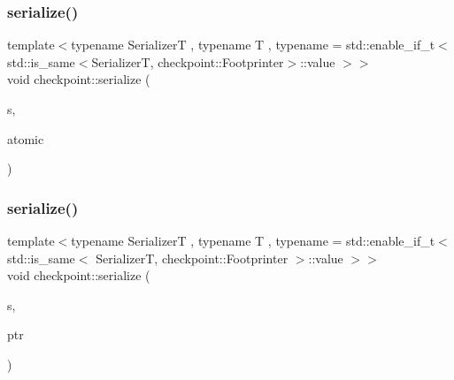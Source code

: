 \mbox{\label{namespacecheckpoint_a40ca9a5c99807bd8a0610098d94b5125}} 
\subsubsection{\texorpdfstring{serialize()}{serialize()}\hspace{0.1cm}{\footnotesize\ttfamily [7/29]}}
{\footnotesize\ttfamily template$<$typename SerializerT , typename T , typename  = std\+::enable\+\_\+if\+\_\+t$<$    std\+::is\+\_\+same$<$\+Serializer\+T, checkpoint\+::\+Footprinter$>$\+::value  $>$$>$ \\
void checkpoint\+::serialize (\begin{DoxyParamCaption}\item[{SerializerT \&}]{s,  }\item[{const std\+::atomic$<$ T $>$ \&}]{atomic }\end{DoxyParamCaption})}

\mbox{\label{namespacecheckpoint_aff1bebba5ce7fda79f83d2af8c859254}} 
\subsubsection{\texorpdfstring{serialize()}{serialize()}\hspace{0.1cm}{\footnotesize\ttfamily [8/29]}}
{\footnotesize\ttfamily template$<$typename SerializerT , typename T , typename  = std\+::enable\+\_\+if\+\_\+t$<$    std\+::is\+\_\+same$<$      Serializer\+T,      checkpoint\+::\+Footprinter    $>$\+::value  $>$$>$ \\
void checkpoint\+::serialize (\begin{DoxyParamCaption}\item[{SerializerT \&}]{s,  }\item[{std\+::shared\+\_\+ptr$<$ T $>$ \&}]{ptr }\end{DoxyParamCaption})}

\mbox{\label{namespacecheckpoint_ad3043fe034b7bf1d0d864e1e819c84d4}} 
